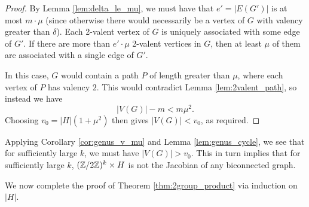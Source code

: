 \documentclass{amsart}
\begin{document}
\begin{proof}
  By Lemma \ref{lem:delta_le_mu}, we must have that $e' = |E(G')|$ is
  at most $m \cdot \mu$ (since otherwise there would necessarily be a
  vertex of $G$ with valency greater than $\delta$). Each 2-valent
  vertex of $G$ is uniquely associated with some edge of $G'$. If
  there are more than $e' \cdot \mu$ 2-valent vertices in $G$, then at
  least $\mu$ of them are associated with a single edge of $G'$. 

  In this case, $G$ would contain a path $P$ of length greater than $\mu$, where
  each vertex of $P$ has valency $2$. This would contradict Lemma
  \ref{lem:2valent_path}, so instead we have 
  \[
  |V(G)| - m < m\mu^2.
  \] 
  Choosing $v_0 = |H|(1 + \mu^2)$ then gives $|V(G)| < v_0$, as
  required.
\end{proof}

Applying Corollary \ref{cor:genus_v_mu} and Lemma
\ref{lem:genus_cycle}, we see that for sufficiently large $k$, we must
have $|V(G)| > v_0$. This in turn implies that for sufficiently large
$k$, $(\mathbb{Z}/2\mathbb{Z})^k \times H$ is not the Jacobian of any biconnected
graph.

We now complete the proof of Theorem \ref{thm:2group_product} via
induction on $|H|$.
  
\end{document}

